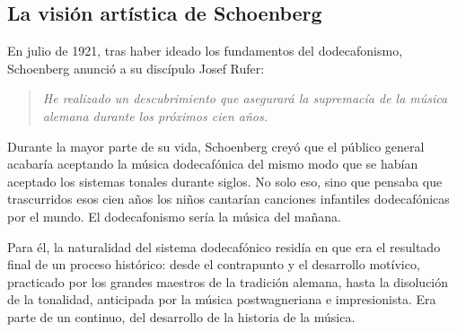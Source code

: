 %    
%    
%    
%        
%    
    
    \subsection{La visión artística de Schoenberg}
    En julio de 1921, tras haber ideado los fundamentos del dodecafonismo, Schoenberg anunció a su discípulo Josef Rufer:
    \begin{quote}\emph{He realizado un descubrimiento que asegurará la supremacía de la música alemana durante los próximos cien años.}\end{quote}
    Durante la mayor parte de su vida, Schoenberg creyó que el público general acabaría aceptando la música dodecafónica del mismo modo que se habían aceptado los sistemas tonales durante siglos. No solo eso, sino que pensaba que trascurridos esos cien años los niños cantarían canciones infantiles dodecafónicas por el mundo. El dodecafonismo sería la música del mañana.
    
    Para él, la naturalidad del sistema dodecafónico residía en que era el resultado final de un proceso histórico: desde el contrapunto y el desarrollo motívico, practicado por los grandes maestros de la tradición alemana, hasta la disolución de la tonalidad, anticipada por la música postwagneriana e impresionista. Era parte de un continuo, del desarrollo de la historia de la música.
    
